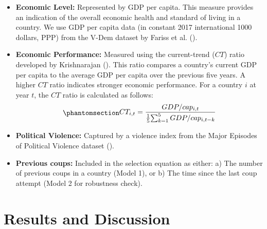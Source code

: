 \documentclass[
  12pt,
]{report}
\begin{document}
\begin{itemize}
\item
  \textbf{Economic Level:} Represented by GDP per capita. This measure
  provides an indication of the overall economic health and standard of
  living in a country. We use GDP per capita data (in constant 2017
  international 1000 dollars, PPP) from the V-Dem dataset by Fariss et
  al. ().
\item
  \textbf{Economic Performance:} Measured using the current-trend
  (\(CT\)) ratio developed by Krishnarajan
  (). This ratio compares a
  country's current GDP per capita to the average GDP per capita over
  the previous five years. A higher \(CT\) ratio indicates stronger
  economic performance. For a country \(i\) at year \(t\), the \(CT\)
  ratio is calculated as follows:
  \begin{equation}\phantomsection\label{eq-eq6}{
  \begin{aligned}
  CT_{i,t} = {GDP/cap_{i,t} \over {1 \over 5} {\sum_{k=1}^5GDP/cap_{i,t-k}}}
  \end{aligned}
  }\end{equation}
\item
  \textbf{Political Violence:} Captured by a violence index from the
  Major Episodes of Political Violence dataset
  ().
\item
  \textbf{Previous coups:} Included in the selection equation as either:
  a) The number of previous coups in a country (Model 1), or b) The time
  since the last coup attempt (Model 2 for robustness check).
\end{itemize}

\section{Results and Discussion}\label{results-and-discussion}
\end{document}
